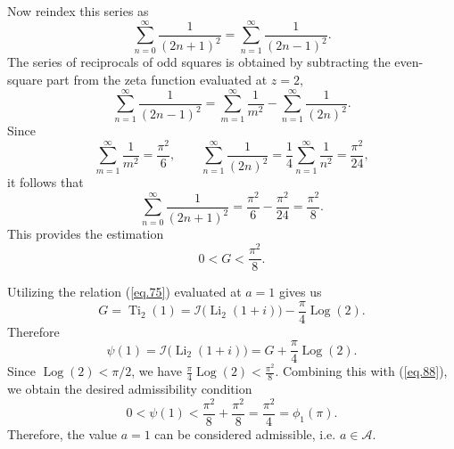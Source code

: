 \documentclass[preprint,12pt,nopreprintline]{elsarticle}
\begin{document}
Now reindex this series as
\begin{equation}
\sum_{n=0}^\infty \frac{1}{(2n+1)^2}
=
\sum_{n=1}^\infty \frac{1}{(2n-1)^2}.
\end{equation}
The series of reciprocals of odd squares is obtained by subtracting the even-square part from the zeta function evaluated at \(z=2\),
\begin{equation}
\sum_{n=1}^\infty \frac{1}{(2n-1)^2}
=
\sum_{m=1}^\infty \frac{1}{m^2}
-
\sum_{n=1}^\infty \frac{1}{(2n)^2}.
\end{equation}
Since
\begin{equation}
\sum_{m=1}^\infty \frac{1}{m^2}=\frac{\pi^2}{6},
\qquad
\sum_{n=1}^\infty \frac{1}{(2n)^2}
=
\frac{1}{4}\sum_{n=1}^\infty \frac{1}{n^2}
=
\frac{\pi^2}{24},
\end{equation}
it follows that
\begin{equation}
\sum_{n=0}^\infty \frac{1}{(2n+1)^2}
=
\frac{\pi^2}{6}-\frac{\pi^2}{24}
=
\frac{\pi^2}{8}.
\end{equation}
This provides the estimation
\begin{equation}\label{eq.88}
0<G<\frac{\pi^2}{8}.
\end{equation}

Utilizing the relation (\ref{eq.75}) evaluated at \(a=1\) gives us
\begin{equation}
G=\operatorname{Ti}_2(1)=\mathscr{I}\!\bigl(\operatorname{Li}_2(1+i)\bigr)-\frac{\pi}{4}\operatorname{Log}\left(2\right).
\end{equation}
Therefore
\begin{equation}\label{eq.90}
\psi(1)=\mathscr{I}\!\bigl(\operatorname{Li}_2(1+i)\bigr)=G+\frac{\pi}{4}\operatorname{Log}\left(2\right).
\end{equation}
Since \(\operatorname{Log}\left(2\right)<\pi/2\), we have \(\frac{\pi}{4}\operatorname{Log}\left(2\right)<\frac{\pi^2}{8}\).
Combining this with (\ref{eq.88}), we obtain the desired admissibility condition
\begin{equation}
0<\psi(1)<\frac{\pi^2}{8}+\frac{\pi^2}{8}=\frac{\pi^2}{4}=\phi_1(\pi).
\tag{4.18}
\end{equation}
Therefore, the value \(a=1\) can be considered admissible, i.e. \(a\in\mathscr{A}\).
\end{document}
